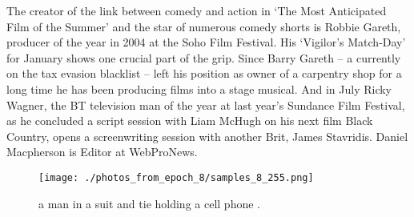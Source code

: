 \documentclass{article}%
\begin{document}
The creator of the link between comedy and action in ‘The Most Anticipated Film of the Summer’ and the star of numerous comedy shorts is Robbie ­Gareth, producer of the year in 2004 at the Soho Film Festival. His ‘Vigilor’s Match{-}Day’ for January shows one crucial part of the grip. Since Barry ­Gareth – a currently on the tax evasion blacklist – left his position as owner of a carpentry shop for a long time he has been producing films into a stage musical.\newline%
And in July Ricky Wagner, the BT television man of the year at last year’s Sundance Film Festival, as he concluded a script session with Liam McHugh on his next film Black Country, opens a screenwriting session with another Brit, James Stavridis.\newline%
Daniel Macpherson is Editor at WebProNews.\newline%

%


\begin{figure}[h!]%
\centering%
\texttt{[image: ./photos\_from\_epoch\_8/samples\_8\_255.png]}%
\caption{a man in a suit and tie holding a cell phone .}%
\end{figure}

%
\end{document}
